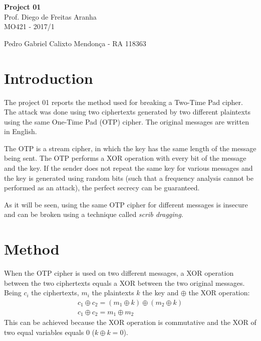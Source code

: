\documentclass[a4paper,11pt]{article}
\begin{document}
\begin{center}
\textbf{Project 01}\\ \hspace{5pt}Prof. Diego de Freitas Aranha\\MO421 - 2017/1
\end{center}

\begin{center}
Pedro Gabriel Calixto Mendon\c{c}a - RA 118363\\
\end{center}


\section{Introduction}
\hspace{14pt}

The project 01 reports the method used for breaking a Two-Time Pad cipher.
The attack was done using two ciphertexts generated by two different plaintexts
using the same One-Time Pad (OTP) cipher. The original messages are written
in English.

The OTP is a stream cipher, in which the key has the same length of the message
being sent. The OTP performs a XOR operation with every bit of the message and
the key. If the sender does not repeat the same key for various messages and the
key is generated using random bits (such that a frequency analysis cannot be
performed as an attack), the perfect secrecy can be guaranteed.

As it will be seen, using the same OTP cipher for different messages is insecure
and can be broken using a technique called \textit{scrib dragging}.

\section{Method} \label{method}
\hspace{14pt}

When the OTP cipher is used on two different messages, a XOR operation between
the two ciphertexts equals a XOR between the two original messages.
Being $c_i$ the ciphertexts, $m_i$ the plaintexts $k$ the key and $\oplus$ the XOR
operation:
\begin{gather*}
	c_1 \oplus c_2 = (m_1 \oplus k) \oplus (m_2 \oplus k) \\
	c_1 \oplus c_2 = m_1 \oplus m_2
\end{gather*}
This can be achieved because the XOR operation is commutative and the XOR of
two equal variables equals 0 ($k \oplus k = 0$).
\end{document}
